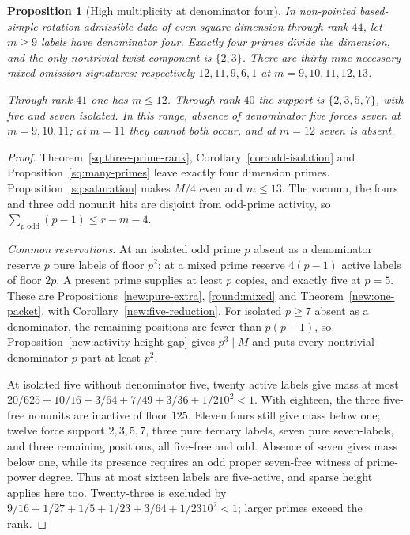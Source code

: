 \documentclass[11pt]{amsart}
\numberwithin{equation}{section}
\newtheorem{proposition}[theorem]{Proposition}
\theoremstyle{definition}
\theoremstyle{plain}
\begin{document}
\begin{proposition}[High multiplicity at denominator four]
\label{sq:thirteen-34}\label{next:high-four44}
In non-pointed based-simple rotation-admissible data of even square
dimension through rank $44$, let $m\ge9$ labels have denominator
four. Exactly four primes divide the dimension, and the only
nontrivial twist component is $\{2,3\}$. There are thirty-nine
necessary mixed omission signatures: respectively $12,11,9,6,1$
at $m=9,10,11,12,13$.

Through rank $41$ one has $m\le12$. Through rank $40$ the support
is $\{2,3,5,7\}$, with five and seven isolated. In this range,
absence of denominator five forces seven at $m=9,10,11$; at $m=11$
they cannot both occur, and at $m=12$ seven is absent.
\end{proposition}
\begin{proof}
Theorem~\ref{sq:three-prime-rank}, Corollary~\ref{cor:odd-isolation}
and Proposition~\ref{sq:many-primes} leave exactly four dimension
primes. Proposition~\ref{sq:saturation} makes $M/4$ even and
$m\le13$. The vacuum, the fours and three odd nonunit hits are
disjoint from odd-prime activity, so
$\sum_{p\text{ odd}}(p-1)\le r-m-4$.

\emph{Common reservations.}
At an isolated odd prime $p$ absent as a denominator reserve $p$
pure labels of floor $p^2$; at a mixed prime reserve $4(p-1)$ active
labels of floor $2p$. A present prime supplies at least $p$ copies,
and exactly five at $p=5$. These are
Propositions~\ref{new:pure-extra}, \ref{round:mixed} and
Theorem~\ref{new:one-packet}, with Corollary~\ref{new:five-reduction}.
For isolated $p\ge7$ absent as a denominator, the remaining positions are fewer than
$p(p-1)$, so Proposition~\ref{new:activity-height-gap} gives
$p^3\mid M$ and puts every nontrivial denominator $p$-part at least $p^2$.

At isolated five without denominator five, twenty active labels give mass at most
$20/625+10/16+3/64+7/49+3/36+1/210^2<1$.
With eighteen, the three five-free nonunits are inactive of floor
$125$. Eleven fours still give mass below one; twelve force support
$2,3,5,7$, three pure ternary labels, seven pure seven-labels, and
three remaining positions, all five-free and odd. Absence of seven
gives mass below one, while its presence requires an odd proper
seven-free witness of prime-power degree. Thus at most sixteen
labels are five-active, and sparse height applies here too.
Twenty-three is excluded by
$9/16+1/27+1/5+1/23+3/64+1/2310^2<1$; larger primes exceed the rank.


\end{proof}
\end{document}
